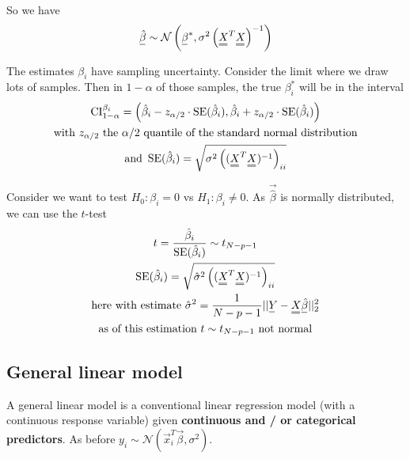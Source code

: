 
So we have
\begin{equation}
    \vec{\hat{\beta}} \sim \mathcal{N}\left(\vec{\beta}^*, \sigma^2 \left(\mat{X}^T \mat{X}\right)^{-1}\right)
\end{equation}

The estimates $\beta_i$ have sampling uncertainty. Consider
the limit where we draw lots of samples. Then in $1-\alpha$
of those samples, the true $\beta_i^*$ will be in the interval
\begin{equation}
    \begin{gathered}
        \operatorname{CI}_{1-\alpha}^{\beta_i} = \left( \hat{\beta}_i - z_{\alpha/2} \cdot \operatorname{SE}( \hat{\beta}_i ), \hat{\beta}_i + z_{\alpha/2} \cdot \operatorname{SE}( \hat{\beta}_i ) \right) \\
        \text{with } z_{\alpha/2} \text{ the } \alpha/2 \text{ quantile of the standard normal distribution} \\
        \text{and } \operatorname{SE}( \hat{\beta}_i ) = \sqrt{\sigma^2 \left( (\mat{X}^T \mat{X})^{-1} \right)_{ii}}
    \end{gathered}
\end{equation}

Consider we want to test $H_0: \beta_i = 0$ vs $H_1: \beta_i \neq 0$. As $\vec{\hat{\beta}}$ is normally distributed, we can use the $t$-test
\begin{equation}
    \begin{gathered}
        t = \frac{\hat{\beta}_i}{\operatorname{SE}(\hat{\beta}_i)} \sim t_{N-p-1} \\
       \operatorname{SE}(\hat{\beta}_i) = \sqrt{\hat{\sigma}^2 \left( (\mat{X}^T \mat{X})^{-1} \right)_{ii}} \\
       \text{here with estimate } \hat{\sigma}^2 = \frac{1}{N-p-1} ||\vec{Y} - \mat{X} \vec{\hat{\beta}}||_2^2 \\
       \text{as of this estimation } t \sim t_{N-p-1} \text{ not normal}
    \end{gathered}
\end{equation}

\subsection{General linear model}
A general linear model is a conventional linear regression model
(with a continuous response variable) given \textbf{continuous and / or
categorical predictors}. As before $y_i \sim \mathcal{N}(\vec{x}_i^T \vec{\beta}, \sigma^2)$.

